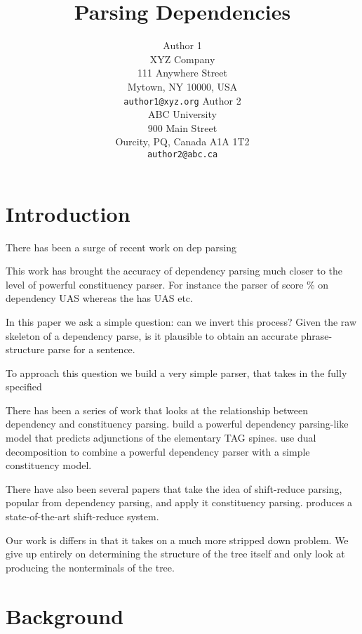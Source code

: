 \documentclass[11pt,letterpaper]{article}
\title{Parsing Dependencies}
\author{Author 1\\
	    XYZ Company\\
	    111 Anywhere Street\\
	    Mytown, NY 10000, USA\\
	    {\tt author1@xyz.org}
	  \And
	Author 2\\
  	ABC University\\
  	900 Main Street\\
  	Ourcity, PQ, Canada A1A 1T2\\
  {\tt author2@abc.ca}}
\date{}
\begin{document}
\maketitle
\begin{abstract}

\end{abstract}





\section{Introduction}


There has been a surge of recent work on dep parsing

\cite{}
\cite{}
\cite{}

This work has brought the accuracy of dependency parsing much closer to the level
of powerful constituency parser. For instance the parser of \cite{}
score \% on dependency UAS whereas the has UAS etc.


In this paper we ask a simple question: can we invert this process?
Given the raw skeleton of a dependency parse, is it plausible to obtain
an accurate phrase-structure parse for a sentence.

To approach this question we build a very simple parser,
that takes in the fully specified


There has been a series of work that looks at the relationship
between dependency and constituency parsing. \cite{carraers}
build a powerful dependency parsing-like model that predicts
adjunctions of the elementary TAG spines. \cite{rush} use
dual decomposition to combine a powerful dependency parser with
a simple constituency model.

There have also been several papers that take the idea of
shift-reduce parsing, popular from dependency parsing, and apply
 it constituency parsing. \cite{zpar} produces a state-of-the-art shift-reduce
system. \cite{stanford}

Our work is differs in that it takes on a much more stripped down problem.
We give up entirely on determining the structure of the tree itself and only
look at  producing the nonterminals of the tree.


\section{Background}
\end{document}
